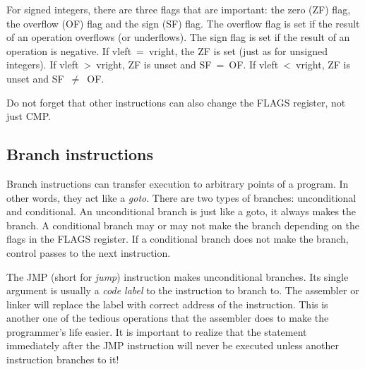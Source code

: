 For signed integers, there are three flags
that are important: the zero  (ZF) flag, the
overflow (OF) flag and the sign
 (SF) flag. The overflow flag is set if the result of an operation
overflows (or underflows). The sign flag is set if the result of an
operation is negative. If {\code vleft~=~vright}, the ZF is set (just
as for unsigned integers). If {\code vleft~>~vright}, ZF is unset and
SF~=~OF.  If {\code vleft~<~vright}, ZF is unset and SF~$\neq$~OF.

Do not forget that other instructions can also change the FLAGS
register, not just {\code CMP}.

\subsection{Branch instructions}

Branch instructions can transfer execution to arbitrary points of a program.
In other words, they act like a \emph{goto}. There are two types of branches:
unconditional and conditional. An unconditional branch is just like a goto,
it always makes the branch. A conditional branch may or may not make the
branch depending on the flags in the FLAGS register. If a conditional branch
does not make the branch, control passes to the next instruction.

The {\code JMP} (short for \emph{jump}) instruction makes
unconditional branches. Its single argument is usually a \emph{code
label} to the instruction to branch to. The assembler or linker will
replace the label with correct address of the instruction. This is
another one of the tedious operations that the assembler does to make
the programmer's life easier. It is important to realize that the
statement immediately after the {\code JMP} instruction will never be
executed unless another instruction branches to it!

